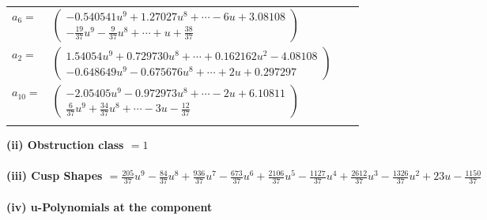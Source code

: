 \documentclass[1p]{elsarticle_modified}
\theoremstyle{definition}
\begin{document}
\begin{tabular}{m{7pt} m{180pt} m{7pt} m{180pt} }
\flushright $a_{6}=$&$\begin{pmatrix}-0.540541 u^{9}+1.27027 u^{8}+\cdots-6 u+3.08108\\-\frac{19}{37} u^9-\frac{9}{37} u^8+\cdots+u+\frac{38}{37}\end{pmatrix}$ \\
\flushright $a_{2}=$&$\begin{pmatrix}1.54054 u^{9}+0.729730 u^{8}+\cdots+0.162162 u^{2}-4.08108\\-0.648649 u^{9}-0.675676 u^{8}+\cdots+2 u+0.297297\end{pmatrix}$ \\
\flushright $a_{10}=$&$\begin{pmatrix}-2.05405 u^{9}-0.972973 u^{8}+\cdots-2 u+6.10811\\\frac{6}{37} u^9+\frac{34}{37} u^8+\cdots-3 u-\frac{12}{37}\end{pmatrix}$\\&\end{tabular}
\flushleft \textbf{(ii) Obstruction class $= 1$}\\~\\
\flushleft \textbf{(iii) Cusp Shapes $= \frac{205}{37} u^9-\frac{84}{37} u^8+\frac{936}{37} u^7-\frac{673}{37} u^6+\frac{2106}{37} u^5-\frac{1127}{37} u^4+\frac{2612}{37} u^3-\frac{1326}{37} u^2+23 u-\frac{1150}{37}$}\\~\\
\newpage\renewcommand{\arraystretch}{1}
\flushleft \textbf{(iv) u-Polynomials at the component}\newline \\
\end{document}
